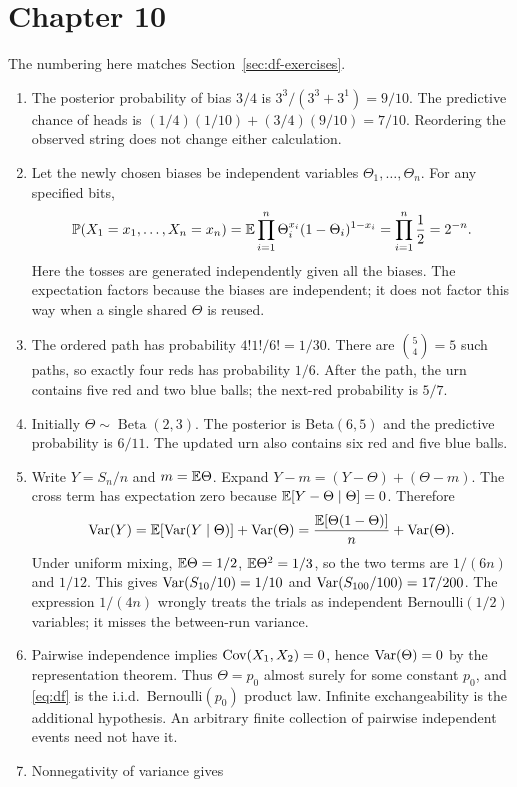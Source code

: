 \section*{Chapter 10}
The numbering here matches Section~\ref{sec:df-exercises}.
\begin{enumerate}
  \item The posterior probability of bias $3/4$ is
  $3^3/(3^3+3^1)=9/10$. The predictive chance of heads is
  $(1/4)(1/10)+(3/4)(9/10)=7/10$. Reordering the observed string does
  not change either calculation.
  \item Let the newly chosen biases be independent variables
  $\Theta_1,\ldots,\Theta_n$. For any specified bits,
  \[
  \mathbb P(X_1=x_1,\ldots,X_n=x_n)
  =\mathbb E\prod_{i=1}^n\Theta_i^{x_i}(1-\Theta_i)^{1-x_i}
  =\prod_{i=1}^n\frac12=2^{-n}.
  \]
  Here the tosses are generated independently given all the biases.
  The expectation factors because the biases are independent; it does
  not factor this way when a single shared $\Theta$ is reused.
  \item The ordered path has probability
  $4!1!/6!=1/30$. There are $\binom54=5$ such paths, so exactly four
  reds has probability $1/6$. After the path, the urn contains five
  red and two blue balls; the next-red probability is $5/7$.
  \item Initially $\Theta\sim\operatorname{Beta}(2,3)$. The posterior
  is Beta$(6,5)$ and the predictive probability is $6/11$.
  The updated urn also contains six red and five blue balls.
  \item Write $Y=S_n/n$ and $m=\mathbb E\Theta$. Expand
  $Y-m=(Y-\Theta)+(\Theta-m)$. The cross term has expectation zero
  because $\mathbb E[Y-\Theta\mid\Theta]=0$. Therefore
  \[
  \operatorname{Var}(Y)=\mathbb E[\operatorname{Var}(Y\mid\Theta)]+\operatorname{Var}(\Theta)
  =\frac{\mathbb E[\Theta(1-\Theta)]}{n}+\operatorname{Var}(\Theta).
  \]
  Under uniform mixing, $\mathbb E\Theta=1/2$, $\mathbb E\Theta^2=1/3$,
  so the two terms are $1/(6n)$ and $1/12$. This gives
  $\operatorname{Var}(S_{10}/10)=1/10$ and $\operatorname{Var}(S_{100}/100)=17/200$.
  The expression $1/(4n)$ wrongly treats the trials as independent
  Bernoulli$(1/2)$ variables; it misses the between-run variance.
  \item Pairwise independence implies $\operatorname{Cov}(X_1,X_2)=0$, hence
  $\operatorname{Var}(\Theta)=0$ by the representation theorem. Thus
  $\Theta=p_0$ almost surely for some constant $p_0$, and
  \eqref{eq:df} is the i.i.d.\ Bernoulli$(p_0)$ product law.
  Infinite exchangeability is the additional hypothesis. An arbitrary
  finite collection of pairwise independent events need not have it.
  \item Nonnegativity of variance gives

\end{enumerate}
